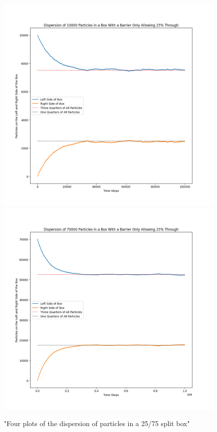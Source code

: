 \documentclass[12pt, A4]{article}
\begin{document}
\begin{figure}[h]
\begin{center}
    \includegraphics[scale=0.35]{Task_4_Line}
    \includegraphics[scale=0.35]{Task_4_Line_70000}
  \end{center}
  \caption{"Four plots of the dispersion of particles in a 25/75 split box"}
  \label{fig4}
\end{figure}
\end{document}
